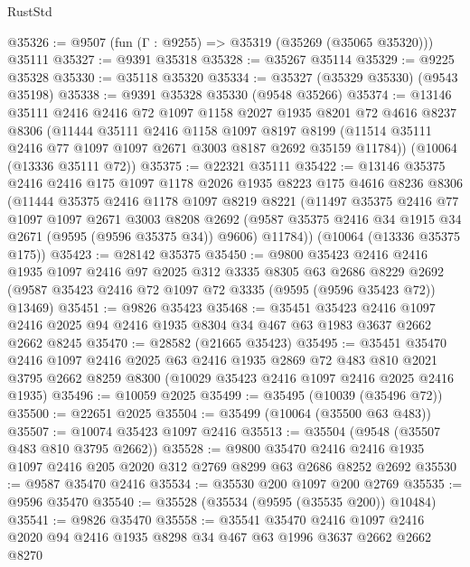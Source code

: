 \begin{lexlean}{RustStd}
\begin{coremodule}
@35326 := @9507 (fun (Γ : @9255) => @35319 (@35269 (@35065 @35320))) @35111
@35327 := @9391 @35318
@35328 := @35267 @35114
@35329 := @9225 @35328
@35330 := @35118 @35320
@35334 := @35327 (@35329 @35330) (@9543 @35198)
@35338 := @9391 @35328 @35330 (@9548 @35266)
@35374 := @13146
    @35111
    @2416
    @2416
    @72
    @1097
    @1158
    @2027
    @1935
    @8201
    @72
    @4616
    @8237
    @8306
    (@11444
      @35111
      @2416
      @1158
      @1097
      @8197
      @8199
      (@11514 @35111 @2416 @77 @1097 @1097 @2671 @3003 @8187 @2692 @35159 @11784))
    (@10064 (@13336 @35111 @72))
@35375 := @22321 @35111
@35422 := @13146
    @35375
    @2416
    @2416
    @175
    @1097
    @1178
    @2026
    @1935
    @8223
    @175
    @4616
    @8236
    @8306
    (@11444
      @35375
      @2416
      @1178
      @1097
      @8219
      @8221
      (@11497
        @35375
        @2416
        @77
        @1097
        @1097
        @2671
        @3003
        @8208
        @2692
        (@9587 @35375 @2416 @34 @1915 @34 @2671 (@9595 (@9596 @35375 @34)) @9606)
        @11784))
    (@10064 (@13336 @35375 @175))
@35423 := @28142 @35375
@35450 := @9800
    @35423
    @2416
    @2416
    @1935
    @1097
    @2416
    @97
    @2025
    @312
    @3335
    @8305
    @63
    @2686
    @8229
    @2692
    (@9587 @35423 @2416 @72 @1097 @72 @3335 (@9595 (@9596 @35423 @72)) @13469)
@35451 := @9826 @35423
@35468 := @35451
    @35423
    @2416
    @1097
    @2416
    @2025
    @94
    @2416
    @1935
    @8304
    @34
    @467
    @63
    @1983
    @3637
    @2662
    @2662
    @8245
@35470 := @28582 (@21665 @35423)
@35495 := @35451
    @35470
    @2416
    @1097
    @2416
    @2025
    @63
    @2416
    @1935
    @2869
    @72
    @483
    @810
    @2021
    @3795
    @2662
    @8259
    @8300
    (@10029 @35423 @2416 @1097 @2416 @2025 @2416 @1935)
@35496 := @10059 @2025
@35499 := @35495 (@10039 (@35496 @72))
@35500 := @22651 @2025
@35504 := @35499 (@10064 (@35500 @63 @483))
@35507 := @10074 @35423 @1097 @2416
@35513 := @35504 (@9548 (@35507 @483 @810 @3795 @2662))
@35528 := @9800
    @35470
    @2416
    @2416
    @1935
    @1097
    @2416
    @205
    @2020
    @312
    @2769
    @8299
    @63
    @2686
    @8252
    @2692
@35530 := @9587 @35470 @2416
@35534 := @35530 @200 @1097 @200 @2769
@35535 := @9596 @35470
@35540 := @35528 (@35534 (@9595 (@35535 @200)) @10484)
@35541 := @9826 @35470
@35558 := @35541
    @35470
    @2416
    @1097
    @2416
    @2020
    @94
    @2416
    @1935
    @8298
    @34
    @467
    @63
    @1996
    @3637
    @2662
    @2662
    @8270

\end{coremodule}
\end{lexlean}
